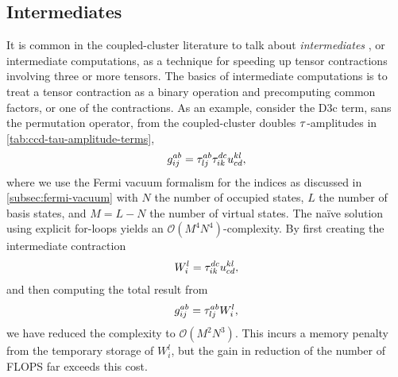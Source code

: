         \subsection{Intermediates}
            It is common in the coupled-cluster literature to talk about
            \emph{intermediates} \cite{gauss1995coupled, hjorth2017advanced}, or
            intermediate computations, as a technique for speeding up tensor
            contractions involving three or more tensors.
            The basics of intermediate computations is to treat a tensor
            contraction as a binary operation and precomputing common factors,
            or one of the contractions.
            As an example, consider the D3c term, sans the permutation operator,
            from the coupled-cluster doubles $\tau$-amplitudes in
            \autoref{tab:ccd-tau-amplitude-terms},
            \begin{align}
                g^{ab}_{ij} = \tau^{ab}_{lj} \tau^{dc}_{ik}
                u^{kl}_{cd},
            \end{align}
            where we use the Fermi vacuum formalism for the indices as discussed
            in \autoref{subsec:fermi-vacuum} with $N$ the number of occupied
            states, $L$ the number of basis states, and $M = L - N$ the number
            of virtual states.
            The naïve solution using explicit for-loops yields an
            $\mathcal{O}(M^4 N^4)$-complexity.
            By first creating the intermediate contraction
            \begin{align}
                W^{l}_{i} = \tau^{dc}_{ik} u^{kl}_{cd},
                \label{eq:w_li}
            \end{align}
            and then computing the total result from
            \begin{align}
                g^{ab}_{ij} = \tau^{ab}_{lj} W^{l}_{i},
            \end{align}
            we have reduced the complexity to $\mathcal{O}(M^2 N^3)$.
            This incurs a memory penalty from the temporary storage of
            $W^{l}_{i}$, but the gain in reduction of the number of FLOPS far
            exceeds this cost.

